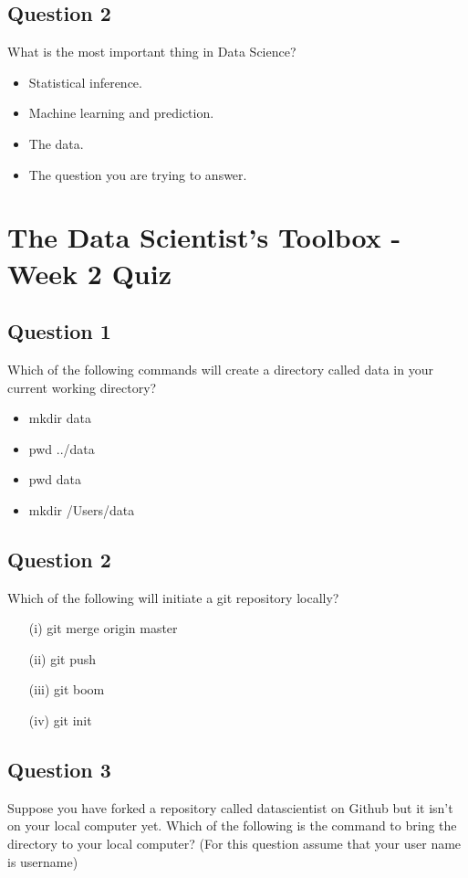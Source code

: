 \documentclass[12pt]{article}
\begin{document}
\subsection*{Question 2}
What is the most important thing in Data Science?
\begin{itemize}
\item Statistical inference.
\item Machine learning and prediction.
\item The data.
\item The question you are trying to answer.
\end{itemize}

\newpage
\section*{The Data Scientist’s Toolbox - Week 2 Quiz}

\subsection*{Question 1}
Which of the following commands will create a directory called data in your current working directory?
\begin{itemize}
\item mkdir data
\item pwd ../data
\item pwd data
\item mkdir /Users/data
\end{itemize}
\subsection*{Question 2}
Which of the following will initiate a git repository locally?

\begin{itemize}
\item[(i)]  git merge origin master
\item[(ii)]  git push
\item[(iii)]  git boom
\item[(iv)]  git init
\end{itemize}
\subsection*{Question 3}
Suppose you have forked a repository called datascientist on Github but it isn't on your local computer yet. Which of the following is the command to bring the directory to your local computer? (For this question assume that your user name is username)
\end{document}
